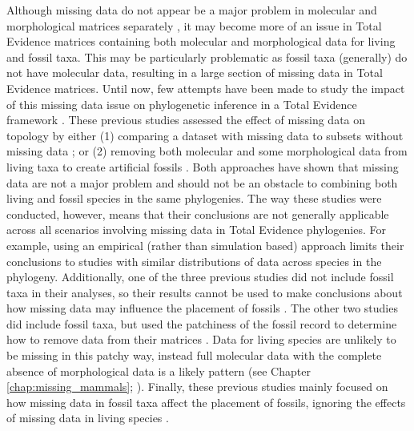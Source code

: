 Although missing data do not appear be a major problem in molecular and morphological matrices separately \citep[as long as enough data overlap in each case, and missing data are not phylogenetically biased;][]{wiensmissing2003,Wiens01102005,wiensmissing2006,wiensmissing2008,lemmonthe2009,Sanderson22072011,rouresite-specific2011,pattinsonphylogeny2014}, it may become more of an issue in Total Evidence matrices containing both molecular and morphological data for living and fossil taxa.
This may be particularly problematic as fossil taxa (generally) do not have molecular data, resulting in a large section of missing data in Total Evidence matrices.
Until now, few attempts have been made to study the impact of this missing data issue on phylogenetic inference in a Total Evidence framework \citep[i.e. using both molecular and morphological data;][]{Wiens01102005,manosphylogeny2007,pattinsonphylogeny2014}.
These previous studies assessed the effect of missing data on topology by either (1) comparing a dataset with missing data to subsets without missing data \citep{Wiens01102005}; or (2) removing both molecular and some morphological data from living taxa to create artificial fossils \citep{manosphylogeny2007,pattinsonphylogeny2014}.
Both approaches have shown that missing data are not a major problem and should not be an obstacle to combining both living and fossil species in the same phylogenies.
The way these studies were conducted, however, means that their conclusions are not generally applicable across all scenarios involving missing data in Total Evidence phylogenies.
For example, using an empirical (rather than simulation based) approach limits their conclusions to studies with similar distributions of data across species in the phylogeny.
Additionally, one of the three previous studies did not include fossil taxa in their analyses, so their results cannot be used to make conclusions about how missing data may influence the placement of fossils \citep{wiensmissing2003}. The other two studies did include fossil taxa, but used the patchiness of the fossil record to determine how to remove data from their matrices \citep{manosphylogeny2007,pattinsonphylogeny2014}. Data for living species are unlikely to be missing in this patchy way, instead full molecular data with the complete absence of morphological data is a likely pattern (see Chapter \ref{chap:missing_mammals}; \citealt{GuillermeCooperMissing}).
Finally, these previous studies mainly focused on how missing data in fossil taxa affect the placement of fossils, ignoring the effects of missing data in living species \citep{manosphylogeny2007,pattinsonphylogeny2014}.

